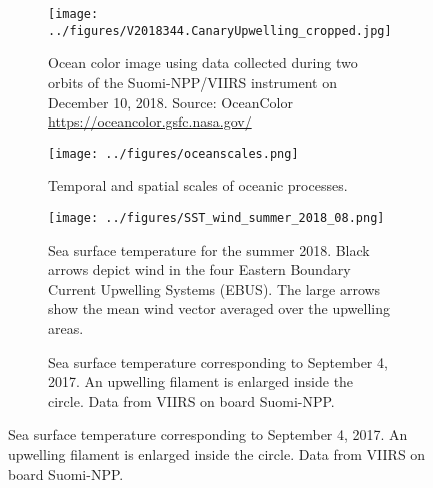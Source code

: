 \documentclass[final,table,svgnames]{article}
\begin{document}
\pagestyle{empty}

\begin{figure}

\begin{subfigure}[t]{.35\textwidth}
\caption{Ocean color image using data collected during two orbits of the Suomi-NPP/VIIRS instrument on December 10, 2018. Source: OceanColor \url{https://oceancolor.gsfc.nasa.gov/}}
\texttt{[image: ../figures/V2018344.CanaryUpwelling\_cropped.jpg]}
\end{subfigure}\hspace{1cm}
\begin{subfigure}[t]{.4\textwidth}
\caption{Temporal and spatial scales of oceanic processes.}
\texttt{[image: ../figures/oceanscales.png]}
\end{subfigure}

\begin{subfigure}[b]{.85\textwidth}
\caption{Sea surface temperature for the summer 2018. Black arrows depict wind in the four Eastern Boundary Current Upwelling Systems (EBUS). The large arrows show the mean wind vector averaged over the upwelling areas.}
\texttt{[image: ../figures/SST\_wind\_summer\_2018\_08.png]}
\end{subfigure}

\begin{subfigure}[b]{.8\textwidth}
\caption{Sea surface temperature corresponding to September 4, 2017. An upwelling filament is enlarged inside the circle. Data from VIIRS on board Suomi-NPP.}
\end{subfigure}
\end{figure}
\end{document}

